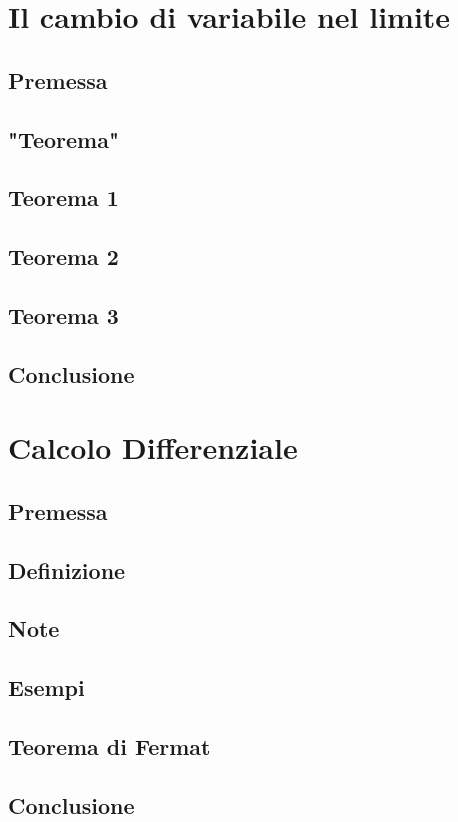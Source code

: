 \documentclass[fontsize = 20px, paper = a4]{article}
\begin{document}
\section{Il cambio di variabile nel limite}
\subsection{Premessa}
\subsection{"Teorema"}
\subsection*{Teorema 1}
\subsection{Teorema 2}
\subsection{Teorema 3}
\subsection{Conclusione}
\section{Calcolo Differenziale}
\subsection{Premessa}
\subsection{Definizione}
\subsection{Note}
\subsection{Esempi}
\subsection{Teorema di Fermat}
\subsection{Conclusione}
\end{document}
